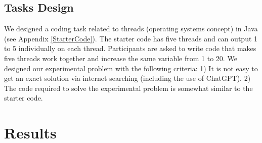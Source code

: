 \documentclass[manuscript,screen,nonacm]{acmart}
\begin{document}
\subsection{Tasks Design}
We designed a coding task related to threads (operating systems concept) in Java (see Appendix \ref{StarterCode}). The starter code has five threads and can output 1 to 5 individually on each thread. Participants are asked to write code that makes five threads work together and increase the same variable from 1 to 20. We designed our experimental problem with the following criteria: 1) It is not easy to get an exact solution via internet searching (including the use of ChatGPT). 2) The code required to solve the experimental problem is somewhat similar to the starter code.

	







\section{Results} 

\end{document}
